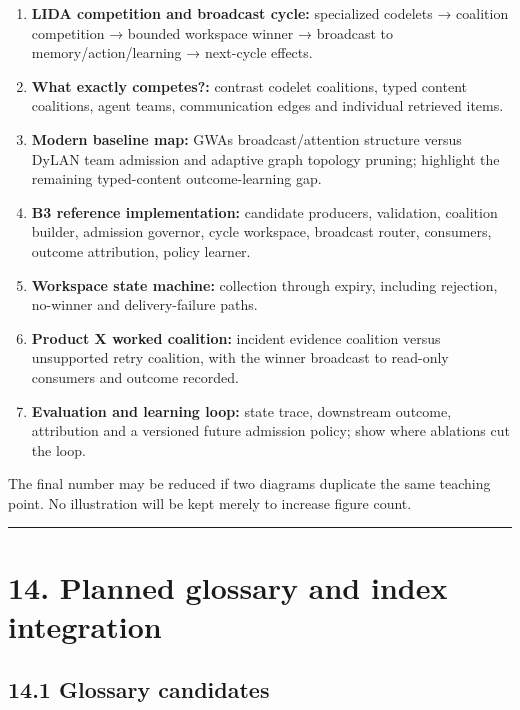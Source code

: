 \begin{enumerate}
\def\labelenumi{\arabic{enumi}.}
\tightlist
\item
  \textbf{LIDA competition and broadcast cycle:} specialized codelets → coalition competition → bounded workspace winner → broadcast to memory/action/learning → next-cycle effects.
\item
  \textbf{What exactly competes?:} contrast codelet coalitions, typed content coalitions, agent teams, communication edges and individual retrieved items.
\item
  \textbf{Modern baseline map:} GWA\textquotesingle s broadcast/attention structure versus DyLAN team admission and adaptive graph topology pruning; highlight the remaining typed-content outcome-learning gap.
\item
  \textbf{B3 reference implementation:} candidate producers, validation, coalition builder, admission governor, cycle workspace, broadcast router, consumers, outcome attribution, policy learner.
\item
  \textbf{Workspace state machine:} collection through expiry, including rejection, no-winner and delivery-failure paths.
\item
  \textbf{Product X worked coalition:} incident evidence coalition versus unsupported retry coalition, with the winner broadcast to read-only consumers and outcome recorded.
\item
  \textbf{Evaluation and learning loop:} state trace, downstream outcome, attribution and a versioned future admission policy; show where ablations cut the loop.
\end{enumerate}

The final number may be reduced if two diagrams duplicate the same teaching point. No illustration will be kept merely to increase figure count.

\begin{center}\rule{0.5\linewidth}{0.5pt}\end{center}

\section{14. Planned glossary and index integration}\label{14-planned-glossary-and-index-integration}

\subsection{14.1 Glossary candidates}\label{141-glossary-candidates}

